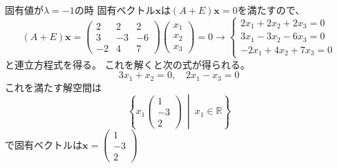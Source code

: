 \documentclass[10pt,b5paper]{ltjsarticle}
\begin{document}
\begin{enumerate}
\begin{enumerate}
              固有値が$\lambda =-1$の時
              固有ベクトル$\bm{x}$は$(A+E)\bm{x}=0$を満たすので、
              \begin{equation}
               (A+E)\bm{x}=
                \begin{pmatrix} 2&2&2\\ 3&-3&-6\\ -2&4&7\end{pmatrix}
                \begin{pmatrix} x_1\\ x_2\\ x_3\end{pmatrix}
                =0
                 \longrightarrow
                 \begin{cases}
                  2x_1 + 2x_2 + 2x_3 =0\\
                  3x_1 - 3x_2 - 6x_3 =0\\
                  -2x_1 + 4x_2 + 7x_3 =0
                 \end{cases}
              \end{equation}
              と連立方程式を得る。
              これを解くと次の式が得られる。
              \begin{equation}
                3x_1+x_2=0, \quad 2x_1-x_3=0
              \end{equation}
              これを満たす解空間は
              \begin{equation}
               \left\{
                x_1\begin{pmatrix} 1\\ -3\\ 2\end{pmatrix}
                \ \middle|\
                x_1 \in \mathbb{R}
               \right\}
              \end{equation}
              で固有ベクトルは$\bm{x}=\begin{pmatrix} 1\\ -3\\ 2\end{pmatrix}$


\end{enumerate}
\end{enumerate}
\end{document}
